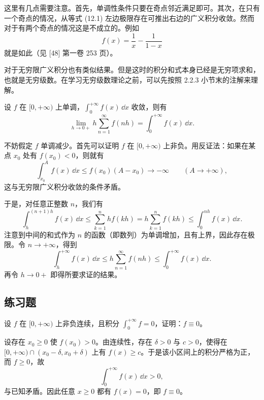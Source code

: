 \begin{xremark}
这里有几点需要注意。首先，单调性条件只要在奇点邻近满足即可。其次，在只有一个奇点的情况，从等式 (12.1) 左边极限存在可推出右边的广义积分收敛。然而对于有两个奇点的情况这是不成立的。例如
\[
  f(x)=\frac1x-\frac1{1-x}
\]
就是如此（见 [48] 第一卷 253 页）。
\end{xremark}

对于无穷限广义积分也有类似结果。但是这时的积分和式本身已经是无穷项求和，也就是无穷级数。在学习无穷级数理论之前，可以先按照 2.2.3 小节末的注解来理解。

\begin{xexample}[12.1.2]
设 $f$ 在 $[0,+\infty)$ 上单调，$\int_0^{+\infty} f(x)\,\dd x$ 收敛，则有
\[
  \lim_{h\to0+}h\sum_{n=1}^{\infty}f(nh)=\int_0^{+\infty}f(x)\,\dd x.
\]
\end{xexample}
\begin{xproof}
不妨假定 $f$ 单调减少。首先可以证明 $f$ 在 $[0,+\infty)$ 上非负。用反证法：如果在某点 $x_0$ 处有 $f(x_0)<0$，则就有
\[
  \int_{x_0}^A f(x)\,\dd x\leq f(x_0)(A-x_0)\to-\infty\qquad(A\to+\infty),
\]
这与无穷限广义积分收敛的条件矛盾。

于是，对任意正整数 $n$，我们有
\[
  \int_h^{(n+1)h}f(x)\,\dd x
  \leq \sum_{k=1}^n hf(kh)
  =h\sum_{k=1}^n f(kh)
  \leq \int_0^{nh}f(x)\,\dd x.
\]
注意到中间的和式作为 $n$ 的函数（即数列）为单调增加，且有上界，因此存在极限。令 $n\to+\infty$，得到
\[
  \int_h^{+\infty}f(x)\,\dd x
  \leq h\sum_{n=1}^{\infty}f(nh)
  \leq \int_0^{+\infty}f(x)\,\dd x.
\]
再令 $h\to0+$ 即得所要求证的结果。
\end{xproof}

\subsection{练习题}

\begin{xexercise}[1]
设 $f$ 在 $[0,+\infty)$ 上非负连续，且积分 $\int_0^{+\infty}f=0$，证明：$f\equiv0$。
\end{xexercise}
\begin{xsolution}
设存在 $x_0\geq0$ 使 $f(x_0)>0$。由连续性，存在 $\delta>0$ 与 $c>0$，使得在
$[0,+\infty)\cap(x_0-\delta,x_0+\delta)$ 上有 $f(x)\geq c$。于是该小区间上的积分严格为正，而 $f\geq0$，故
\[
  \int_0^{+\infty}f(x)\,\dd x>0,
\]
与已知矛盾。因此任意 $x\geq0$ 都有 $f(x)=0$，即 $f\equiv0$。
\end{xsolution}



